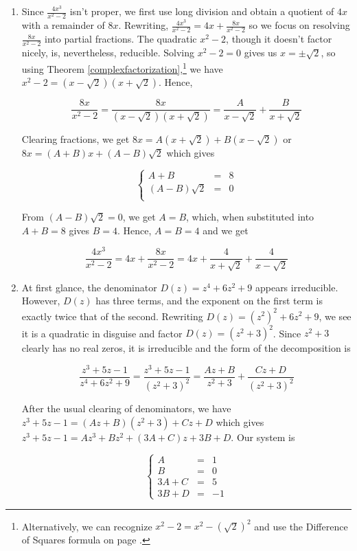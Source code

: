 \documentclass{ximera}
\begin{document}
\begin{example}
\begin{enumerate}
\item  Since  $\frac{4x^3}{x^2-2}$ isn't proper, we first use long division and obtain a quotient of $4x$ with a remainder of $8x$.  Rewriting,  $\frac{4x^3}{x^2-2} = 4x + \frac{8x}{x^2-2}$ so we focus on resolving $\frac{8x}{x^2-2}$ into partial fractions.  The quadratic $x^2-2$, though it doesn't factor nicely, is, nevertheless, reducible. Solving $x^2-2 =0$ gives us $x = \pm \sqrt{2}$, so using Theorem \ref{complexfactorization},\footnote{Alternatively, we can recognize $x^2-2 = x^2-(\sqrt{2})^2$ and use the Difference of Squares formula on page \pageref{CommonFactoringFormulas}.} we have $x^2-2 = \left(x - \sqrt{2}\right)\left(x + \sqrt{2}\right)$. Hence,

\[ \dfrac{8x}{x^2-2} = \dfrac{8x}{ \left(x - \sqrt{2}\right)\left(x + \sqrt{2}\right)} = \dfrac{A}{x - \sqrt{2}} + \dfrac{B}{x + \sqrt{2}} \]

Clearing fractions, we get $8x = A\left(x + \sqrt{2}\right) + B\left(x - \sqrt{2}\right)$ or $8x = (A+B)x + (A-B)\sqrt{2}$ which gives


\[ \left\{ \begin{array}{rcr}  A+B & = & 8 \\ (A-B)\sqrt{2} & = & 0 \\ \end{array} \right.\]

From $(A-B)\sqrt{2}=0$, we get $A=B$, which, when substituted into $A+B = 8$ gives $B = 4$.  Hence, $A = B = 4$ and we get

\[\dfrac{4x^3}{x^2-2} = 4x + \dfrac{8x}{x^2-2} = 4x + \dfrac{4}{x + \sqrt{2}} + \dfrac{4}{x - \sqrt{2}}\]

\item  At first glance, the denominator $D(z) = z^4+6z^2+9$ appears irreducible. However, $D(z)$ has three terms, and the exponent on the first term is exactly twice that of the second.  Rewriting $D(z) = \left(z^2\right)^2 + 6z^2 + 9$, we see it is a quadratic in disguise and factor $D(z) = \left(z^2+3\right)^2$.  Since $z^2+3$ clearly has no real zeros, it is irreducible and the form of the decomposition is

\[ \dfrac{z^3+5z-1}{z^4+6z^2+9} =  \dfrac{z^3+5z-1}{\left(z^2+3\right)^2} = \dfrac{Az+B}{z^2+3} + \dfrac{Cz+D}{\left(z^2+3\right)^2}\]

After the usual clearing of denominators, we have $z^3 + 5z-1 = (Az+B)\left(z^2+3\right) + Cz + D$ which gives $z^3+5z-1 = Az^3 + Bz^2 + (3A+C)z + 3B+D$.  Our system is 

\[ \left\{ \begin{array}{rcr} A & = & 1 \\ B & = & 0 \\ 3A + C & = & 5 \\ 3B+D & = & -1 \end{array} \right.\]


\end{enumerate}
\end{example}
\end{document}
